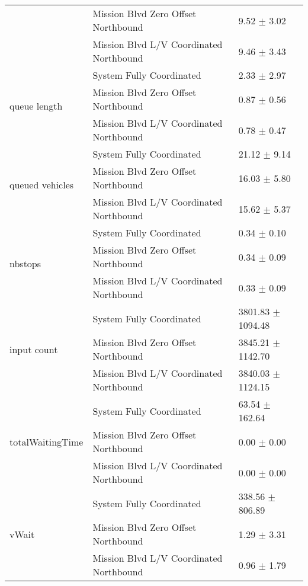 \begin{tabular}{lll}
 & Mission Blvd Zero Offset Northbound & 9.52 $\pm$ 3.02 \\
 & Mission Blvd L/V Coordinated Northbound & 9.46 $\pm$ 3.43 \\
\multirow[t]{3}{*}{queue length} & System Fully Coordinated & 2.33 $\pm$ 2.97 \\
 & Mission Blvd Zero Offset Northbound & 0.87 $\pm$ 0.56 \\
 & Mission Blvd L/V Coordinated Northbound & 0.78 $\pm$ 0.47 \\
\multirow[t]{3}{*}{queued vehicles} & System Fully Coordinated & 21.12 $\pm$ 9.14 \\
 & Mission Blvd Zero Offset Northbound & 16.03 $\pm$ 5.80 \\
 & Mission Blvd L/V Coordinated Northbound & 15.62 $\pm$ 5.37 \\
\multirow[t]{3}{*}{nbstops} & System Fully Coordinated & 0.34 $\pm$ 0.10 \\
 & Mission Blvd Zero Offset Northbound & 0.34 $\pm$ 0.09 \\
 & Mission Blvd L/V Coordinated Northbound & 0.33 $\pm$ 0.09 \\
\multirow[t]{3}{*}{input count} & System Fully Coordinated & 3801.83 $\pm$ 1094.48 \\
 & Mission Blvd Zero Offset Northbound & 3845.21 $\pm$ 1142.70 \\
 & Mission Blvd L/V Coordinated Northbound & 3840.03 $\pm$ 1124.15 \\
\multirow[t]{3}{*}{totalWaitingTime} & System Fully Coordinated & 63.54 $\pm$ 162.64 \\
 & Mission Blvd Zero Offset Northbound & 0.00 $\pm$ 0.00 \\
 & Mission Blvd L/V Coordinated Northbound & 0.00 $\pm$ 0.00 \\
\multirow[t]{3}{*}{vWait} & System Fully Coordinated & 338.56 $\pm$ 806.89 \\
 & Mission Blvd Zero Offset Northbound & 1.29 $\pm$ 3.31 \\
 & Mission Blvd L/V Coordinated Northbound & 0.96 $\pm$ 1.79 \\
\bottomrule
\end{tabular}
